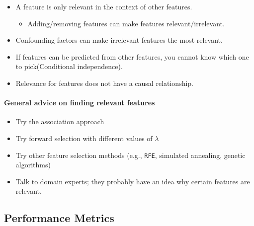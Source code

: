 \documentclass[]{article}
\providecommand{\tightlist}{%
  \setlength{\itemsep}{0pt}\setlength{\parskip}{0pt}}
\let\oldparagraph\paragraph
\renewcommand{\paragraph}[1]{\oldparagraph{#1}\mbox{}}
\begin{document}
\begin{itemize}
\tightlist
\item
  A feature is only relevant in the context of other features.

  \begin{itemize}
  \tightlist
  \item
    Adding/removing features can make features relevant/irrelevant.\\
  \end{itemize}
\item
  Confounding factors can make irrelevant features the most relevant.\\
\item
  If features can be predicted from other features, you cannot know
  which one to pick(Conditional independence).\\
\item
  Relevance for features does not have a causal relationship.
\end{itemize}

\hypertarget{general-advice-on-finding-relevant-features}{%
\paragraph{General advice on finding relevant
features}\label{general-advice-on-finding-relevant-features}}

\begin{itemize}
\tightlist
\item
  Try the association approach\\
\item
  Try forward selection with different values of \(\lambda\)\\
\item
  Try other feature selection methods (e.g., \texttt{RFE}, simulated
  annealing, genetic algorithms)\\
\item
  Talk to domain experts; they probably have an idea why certain
  features are relevant.
\end{itemize}

\hypertarget{performance-metrics}{%
\subsection{Performance Metrics}\label{performance-metrics}}
\end{document}

